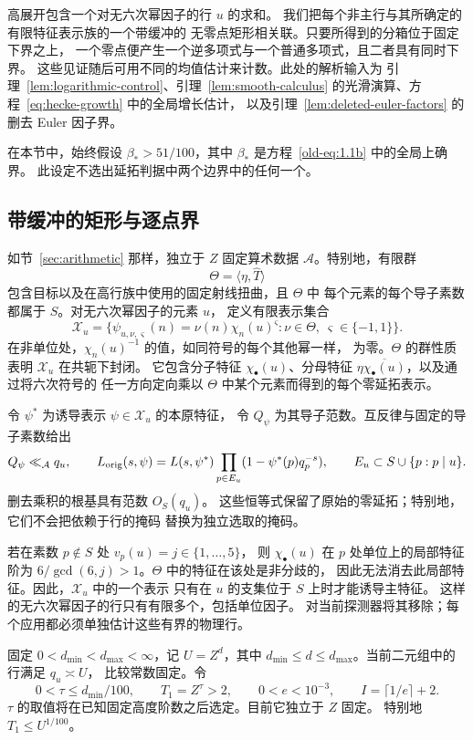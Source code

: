 高展开包含一个对无六次幂因子的行 \(u\) 的求和。
我们把每个非主行与其所确定的有限特征表示族的一个带缓冲的
无零点矩形相关联。只要所得到的分箱位于固定下界之上，
一个零点便产生一个逆多项式与一个普通多项式，且二者具有同时下界。
这些见证随后可用不同的均值估计来计数。此处的解析输入为
引理~\ref{lem:logarithmic-control}、引理~\ref{lem:smooth-calculus}
的光滑演算、方程~\eqref{eq:hecke-growth} 中的全局增长估计，
以及引理~\ref{lem:deleted-euler-factors} 的删去 Euler 因子界。

在本节中，始终假设 \(\beta_*>51/100\)，其中 \(\beta_*\)
是方程~\eqref{old-eq:1.1b} 中的全局上确界。
此设定不选出延拓判据中两个边界中的任何一个。

\subsection{带缓冲的矩形与逐点界}

如节~\ref{sec:arithmetic} 那样，独立于 \(Z\) 固定算术数据
\(\mathcal A\)。特别地，有限群
\[
 \Theta=\langle\eta,\widehat T\rangle
\]
包含目标以及在高行族中使用的固定射线扭曲，且 \(\Theta\) 中
每个元素的每个导子素数都属于 \(S\)。对无六次幂因子的元素 \(u\)，
定义有限表示集合
\[
 \mathcal X_u=
 \bigl\{\psi_{u,\nu,\varsigma}(n)=\nu(n)\chi_n(u)^\varsigma:
       \nu\in\Theta,\ \varsigma\in\{-1,1\}\bigr\}.
\]
在非单位处，\(\chi_n(u)^{-1}\) 的值，如同符号的每个其他幂一样，
为零。\(\Theta\) 的群性质表明 \(\mathcal X_u\) 在共轭下封闭。
它包含分子特征 \(\chi_\bullet(u)\)、分母特征
\(\eta\overline{\chi_\bullet(u)}\)，以及通过将六次符号的
任一方向定向乘以 \(\Theta\) 中某个元素而得到的每个零延拓表示。

令 \(\psi^*\) 为诱导表示 \(\psi\in\mathcal X_u\) 的本原特征，
令 \(Q_\psi\) 为其导子范数。互反律与固定的导子素数给出
\[
 Q_\psi\ll_{\mathcal A}q_u,\qquad
 L_{\rm orig}(s,\psi)
   =L(s,\psi^*)\prod_{p\in E_u}(1-\psi^*(p)q_p^{-s}),
 \qquad
 E_u\subset S\cup\{p:p\mid u\}.
\]
删去乘积的根基具有范数 \(O_S(q_u)\)。
这些恒等式保留了原始的零延拓；特别地，它们不会把依赖于行的掩码
替换为独立选取的掩码。

\label{par:physical-row-ramification}
若在素数 \(p\notin S\) 处 \(v_p(u)=j\in\{1,\ldots,5\}\)，
则 \(\chi_\bullet(u)\) 在 \(p\) 处单位上的局部特征阶为
\(6/\gcd(6,j)>1\)。\(\Theta\) 中的特征在该处是非分歧的，
因此无法消去此局部特征。因此，\(\mathcal X_u\) 中的一个表示
只有在 \(u\) 的支集位于 \(S\) 上时才能诱导主特征。
这样的无六次幂因子的行只有有限多个，包括单位因子。
对当前探测器将其移除；每个应用都必须单独估计这些有界的物理行。

固定 \(0<d_{\min}<d_{\max}<\infty\)，记 \(U=Z^d\)，其中
\(d_{\min}\le d\le d_{\max}\)。当前二元组中的行满足 \(q_u\asymp U\)，
比较常数固定。令
\[
 0<\tau\le d_{\min}/100,\qquad T_1=Z^\tau>2,\qquad
 0<e<10^{-3},\qquad I=\lceil1/e\rceil+2.
\]
\(\tau\) 的取值将在已知固定高度阶数之后选定。目前它独立于 \(Z\) 固定。
特别地 \(T_1\le U^{1/100}\)。

